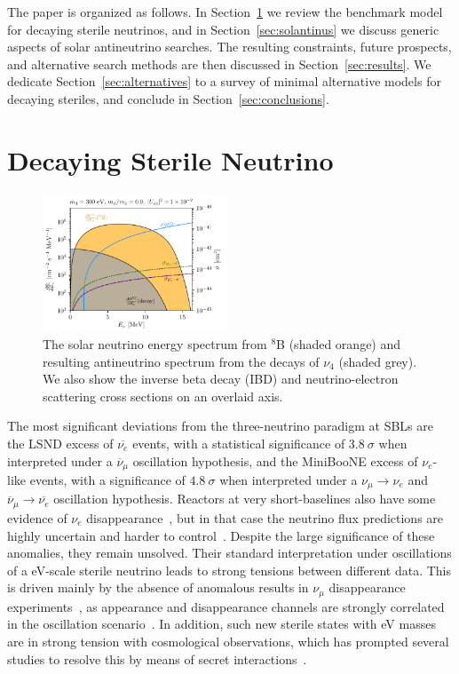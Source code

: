 \documentclass[
reprint,
superscriptaddress,
showpacs,
preprintnumbers,
nofootinbib,
nobibnotes,
amsmath,
amssymb, 
aps,
prd,
floatfix
]{revtex4-1}
\newcommand{\refsec}[1]{Section~\ref{#1}}
\begin{document}
The paper is organized as follows. In \refsec{sec:model} we review the benchmark model for decaying sterile neutrinos, and in \refsec{sec:solantinus} we discuss generic aspects of solar antineutrino searches. The resulting constraints, future prospects, and alternative search methods are then discussed in \refsec{sec:results}. We dedicate \refsec{sec:alternatives} to a survey of minimal alternative models for decaying steriles, and conclude in \refsec{sec:conclusions}.

\section{Decaying Sterile Neutrino}\label{sec:model}
%
\begin{figure}[t]
    \centering
    \includegraphics[width=0.49\textwidth]{Spectrum_scalar_300_MZ_270.pdf}
    \caption{The solar neutrino energy spectrum from $^8$B (shaded orange) and resulting antineutrino spectrum from the decays of $\nu_4$ (shaded grey). We also show the inverse beta decay (IBD) and neutrino-electron scattering cross sections on an overlaid axis. \label{fig:B8flux}}
\end{figure}
%

The most significant deviations from the three-neutrino paradigm at SBLs are the LSND excess of $\overline{\nu_e}$ events, with a statistical significance of $3.8~\sigma$ when interpreted under a $\overline{\nu}_\mu$ oscillation hypothesis, and the MiniBooNE excess of $\nu_e$-like events, with a significance of $4.8~\sigma$ when interpreted under a ${\nu}_\mu\to {\nu_e}$ and $\overline{\nu}_\mu\to \overline{\nu_e}$ oscillation hypothesis. Reactors at very short-baselines also have some evidence of $\nu_e$ disappearance~\cite{Mention:2011rk,Dentler:2017tkw}, but in that case the neutrino flux predictions are highly uncertain and harder to control~\cite{Berryman:2019hme,Berryman:2020agd}. Despite the large significance of these anomalies, they remain unsolved. Their standard interpretation under oscillations of a eV-scale sterile neutrino leads to strong tensions between different data. This is driven mainly by the absence of anomalous results in $\nu_\mu$ disappearance experiments~\cite{Dentler:2018sju,Diaz:2019fwt}, as appearance and disappearance channels are strongly correlated in the oscillation scenario~\cite{Okada:1996kw,Bilenky:1996rw}. In addition, such new sterile states with eV masses are in strong tension with cosmological observations, which has prompted several studies to resolve this by means of secret interactions~\cite{Dasgupta:2013zpn,Hannestad:2013ana}.  
\end{document}
